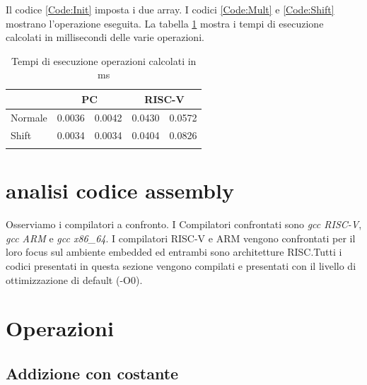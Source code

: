 \documentclass[12pt,a4paper]{report}
\begin{document}
Il codice \ref{Code:Init} imposta i due array.  I codici \ref{Code:Mult} e \ref{Code:Shift} mostrano l'operazione eseguita.
La tabella \ref{Tab:tempi_esecuzioneMS} mostra i tempi di esecuzione calcolati in millisecondi delle varie operazioni.

\begin{table}[h]
\centering
\begin{tabular}{lcccc}
\cline{2-5}
\multicolumn{1}{l|}{}         & \multicolumn{2}{c|}{PC}                                   & \multicolumn{2}{c|}{RISC-V}                               \\ \hline
\multicolumn{1}{|l|}{Normale} & \multicolumn{1}{c|}{0.0036} & \multicolumn{1}{c|}{0.0042} & \multicolumn{1}{c|}{0.0430} & \multicolumn{1}{c|}{0.0572} \\ \hline
\multicolumn{1}{|l|}{Shift}   & \multicolumn{1}{c|}{0.0034} & \multicolumn{1}{c|}{0.0034} & \multicolumn{1}{c|}{0.0404} & \multicolumn{1}{c|}{0.0826} \\ \hline
                              & \multicolumn{1}{l}{}        & \multicolumn{1}{l}{}        & \multicolumn{1}{l}{}        & \multicolumn{1}{l}{}       
\end{tabular}
	\label{Tab:tempi_esecuzioneMS}
	\caption{Tempi di esecuzione operazioni calcolati in ms}
\end{table}
	
	
\section{analisi codice assembly}
Osserviamo i compilatori a confronto.  I Compilatori confrontati sono \textit{gcc RISC-V},  \textit{gcc ARM} e \textit{gcc x86\_64}.  I compilatori RISC-V e ARM vengono confrontati per il loro focus sul ambiente embedded ed entrambi sono architetture RISC.Tutti i codici presentati in questa sezione vengono compilati e presentati con il livello di ottimizzazione di default (-O0).


\section{Operazioni}
\subsection{Addizione con costante}


\end{document}
